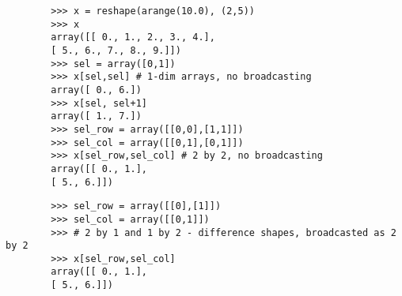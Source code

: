 \documentclass[KSmainSlides.tex]{subfiles}
\begin{document}
\begin{frame}[fragile]
	
	\begin{framed}
		\begin{verbatim}
		>>> x = reshape(arange(10.0), (2,5))
		>>> x
		array([[ 0., 1., 2., 3., 4.],
		[ 5., 6., 7., 8., 9.]])
		>>> sel = array([0,1])
		>>> x[sel,sel] # 1-dim arrays, no broadcasting
		array([ 0., 6.])
		>>> x[sel, sel+1]
		array([ 1., 7.])
		>>> sel_row = array([[0,0],[1,1]])
		>>> sel_col = array([[0,1],[0,1]])
		>>> x[sel_row,sel_col] # 2 by 2, no broadcasting
		array([[ 0., 1.],
		[ 5., 6.]])
		\end{verbatim}
	\end{framed}
	
\end{frame}
\begin{frame}[fragile]
	
	\begin{framed}
		\begin{verbatim}
		>>> sel_row = array([[0],[1]])
		>>> sel_col = array([[0,1]])
		>>> # 2 by 1 and 1 by 2 - difference shapes, broadcasted as 2 by 2
		>>> x[sel_row,sel_col] 
		array([[ 0., 1.],
		[ 5., 6.]])
		\end{verbatim}
	\end{framed}

	
\end{frame}
\end{document}
